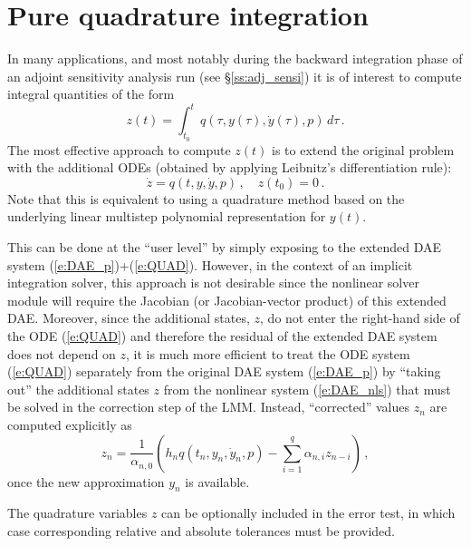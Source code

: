 \section{Pure quadrature integration}\label{s:quad}

In many applications, and most notably during the backward integration phase
of an adjoint sensitivity analysis run (see \S\ref{ss:adj_sensi}) it is of
interest to compute integral quantities of the form
\begin{equation}\label{e:QUAD}
  z(t) = \int_{t_0}^t q(\tau, y(\tau), \dot{y}(\tau), p) \, d\tau \, .
\end{equation}
The most effective approach to compute $z(t)$ is to extend the original problem
with the additional ODEs (obtained by applying Leibnitz's differentiation rule):
\begin{equation}
  \dot z = q(t,y,\dot{y},p) \, , \quad z(t_0) = 0 \, .
\end{equation}
Note that this is equivalent to using a quadrature method based on the underlying
linear multistep polynomial representation for $y(t)$.

This can be done at the ``user level'' by simply exposing to {\idas} the extended
DAE system (\ref{e:DAE_p})+(\ref{e:QUAD}). However, in the context of an implicit
integration solver, this approach is not desirable since the nonlinear solver
module will require the Jacobian (or Jacobian-vector product) of this extended DAE.
Moreover, since the additional states, $z$, do not enter the right-hand side of
the ODE (\ref{e:QUAD}) and therefore the residual of the extended DAE system
does not depend on $z$, it is much more efficient to treat the ODE system (\ref{e:QUAD})
separately from the original DAE system (\ref{e:DAE_p}) by ``taking out'' the additional
states $z$ from the nonlinear system (\ref{e:DAE_nls}) that must be solved in
the correction step of the LMM. Instead, ``corrected'' values $z_n$ are computed
explicitly as
\begin{equation*}
  z_n = \frac{1}{\alpha_{n,0}} \left(
    h_n q(t_n, y_n, \dot{y}_n, p) - \sum_{i=1}^q \alpha_{n,i} z_{n-i}
    \right) \, ,
\end{equation*}
once the new approximation $y_n$ is available.

The quadrature variables $z$ can be optionally included in the error test, in
which case corresponding relative and absolute tolerances must be provided.


